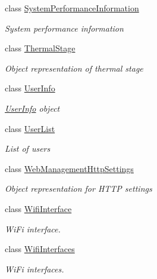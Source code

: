 \begin{DoxyCompactItemize}
class \hyperlink{class_microsoft_1_1_tools_1_1_windows_device_portal_1_1_device_portal_1_1_system_performance_information}{System\+Performance\+Information}
\begin{DoxyCompactList}\small\item\em System performance information \end{DoxyCompactList}\item 
class \hyperlink{class_microsoft_1_1_tools_1_1_windows_device_portal_1_1_device_portal_1_1_thermal_stage}{Thermal\+Stage}
\begin{DoxyCompactList}\small\item\em Object representation of thermal stage \end{DoxyCompactList}\item 
class \hyperlink{class_microsoft_1_1_tools_1_1_windows_device_portal_1_1_device_portal_1_1_user_info}{User\+Info}
\begin{DoxyCompactList}\small\item\em \hyperlink{class_microsoft_1_1_tools_1_1_windows_device_portal_1_1_device_portal_1_1_user_info}{User\+Info} object \end{DoxyCompactList}\item 
class \hyperlink{class_microsoft_1_1_tools_1_1_windows_device_portal_1_1_device_portal_1_1_user_list}{User\+List}
\begin{DoxyCompactList}\small\item\em List of users \end{DoxyCompactList}\item 
class \hyperlink{class_microsoft_1_1_tools_1_1_windows_device_portal_1_1_device_portal_1_1_web_management_http_settings}{Web\+Management\+Http\+Settings}
\begin{DoxyCompactList}\small\item\em Object representation for H\+T\+TP settings \end{DoxyCompactList}\item 
class \hyperlink{class_microsoft_1_1_tools_1_1_windows_device_portal_1_1_device_portal_1_1_wifi_interface}{Wifi\+Interface}
\begin{DoxyCompactList}\small\item\em Wi\+Fi interface. \end{DoxyCompactList}\item 
class \hyperlink{class_microsoft_1_1_tools_1_1_windows_device_portal_1_1_device_portal_1_1_wifi_interfaces}{Wifi\+Interfaces}
\begin{DoxyCompactList}\small\item\em Wi\+Fi interfaces. \end{DoxyCompactList}\item 

\end{DoxyCompactItemize}
